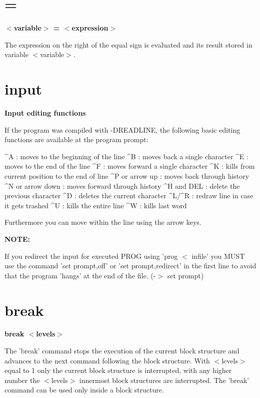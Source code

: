 \section{=}
{\bf $ <$variable$> $ = $ <$expression$> $ \par }
\par
\vspace{3pt}
The expression on the right of the equal sign is evaluated and its result 
stored in variable $ <$variable$> $. 
\section{input}
{\bf Input editing functions \par }
\par
\vspace{3pt}
If the program was compiled with -DREADLINE, the following basic 
editing functions are available at the program prompt: 
\par
\begin{MacVerbatim}
  ^A               : moves to the beginning of the line
  ^B               : moves back a single character
  ^E               : moves to the end of the line
  ^F               : moves forward a single character
  ^K               : kills from current position to the end of line
  ^P or arrow up   : moves back through history
  ^N or arrow down : moves forward through history
  ^H and DEL       : delete the previous character
  ^D               : deletes the current character
  ^L/^R            : redraw line in case it gets trashed
  ^U               : kills the entire line
  ^W               : kills last word
\end{MacVerbatim}
Furthermore you can move within the line using the arrow keys. 
\par
{\bf NOTE: \par }
\par
\vspace{3pt}
If you redirect the input for executed PROG using 'prog $ <$ infile' you 
MUST use the command 'set prompt,off' or 'set prompt,redirect' in 
the first line to avoid that the program 'hangs' at the end of the 
file. (-$> $ set prompt) 
\section{break}
{\bf break $ <$levels$> $ \par }
\par
\vspace{3pt}
The 'break' command stops the execution of the current block structure 
and advances to the next command following the block structure. 
With $ <$levels$> $ equal to 1 only the current block structure is interrupted, 
with any higher number the $ <$levels$> $ innermost block structures are 
interrupted. The 'break' command can be used only inside a block structure. 
